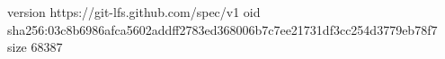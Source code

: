 version https://git-lfs.github.com/spec/v1
oid sha256:03c8b6986afca5602addff2783ed368006b7c7ee21731df3cc254d3779eb78f7
size 68387
